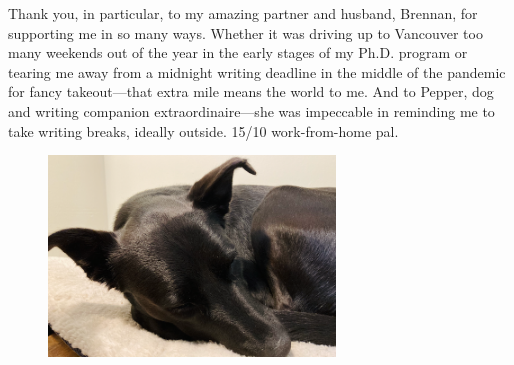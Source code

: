 Thank you, in particular, to my amazing partner and husband, Brennan, for supporting me in so many ways. Whether it was driving up to Vancouver too many weekends out of the year in the early stages of my Ph.D. program or tearing me away from a midnight writing deadline in the middle of the pandemic for fancy takeout---that extra mile means the world to me. And to Pepper, dog and writing companion extraordinaire---she was impeccable in reminding me to take writing breaks, ideally outside. 15/10 work-from-home pal. 
\bigskip

\begin{figure}[hb!]
    \begin{center}
    \includegraphics[width=3in]{figures/IMG_1228.png}     
    \end{center}
  \end{figure}


\endinput %
